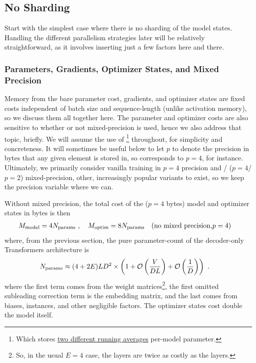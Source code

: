 \documentclass[11pt]{article}
\begin{document}
\subsection{No Sharding}

Start with the simplest case where there is no sharding of the model states. Handling the different
parallelism strategies later will be relatively straightforward, as it involves inserting just a few
factors here and there.

\subsubsection{Parameters, Gradients, Optimizer States, and Mixed Precision
\label{sec_params_grads_optim_mem}}


Memory from the bare parameter cost, gradients, and optimizer states are fixed costs independent of
batch size and sequence-length (unlike activation memory), so we discuss them all together here. The
parameter and optimizer costs are also sensitive to whether or not mixed-precision is used, hence we
also address that topic, briefly.  We will assume the use of \footnote{Which stores
    \href{https://pytorch.org/docs/stable/generated/torch.optim.Adam.html}{two different running
averages} per-model parameter.} throughout, for simplicity and concreteness. It will sometimes be
useful below to let $ p $ to denote the precision in bytes that any given element is stored in, so
 corresponds to $ p=4 $, for instance. Ultimately, we primarily consider
vanilla training in $ p=4 $ precision and / ($ p=4
$/ $ p=2 $)  mixed-precision, other, increasingly popular variants to exist, so we keep the
precision variable where we can.


Without mixed precision, the total cost of the
 ($ p=4 $ bytes) model and optimizer states in bytes is then
\begin{align}
    M _{ \rm model} &= 4 N _{ \rm params } \ , \quad M_{ \rm  optim } = 8 N _{ \rm params }
    \quad ({\rm no \ mixed \ precision, } p=4)
    \label{eq_optimizer_states_mem_no_mp}
\end{align}
where, from the previous section, the pure parameter-count of the decoder-only Transformers
architecture is
\begin{align}
    N _{ \rm params } &\approx  (4 + 2E) L D ^{ 2 } \times \left ( 1 + \mathcal{O} \left( \frac{ V }{ DL }
    \right) + \mathcal{O} \left( \frac{ 1 }{ D } \right)  \right ) \ . \label{eq_approx_params_no_sharding}
\end{align}
where the first term comes from the  weight matrices\footnote{So,
in the usual $ E=4 $ case, the  layers are twice as costly as the
 layers.}, the first omitted subleading correction term is the embedding
matrix, and the last comes from biases,  instances, and other negligible
factors.  The optimizer states cost double the model itself.
\end{document}
